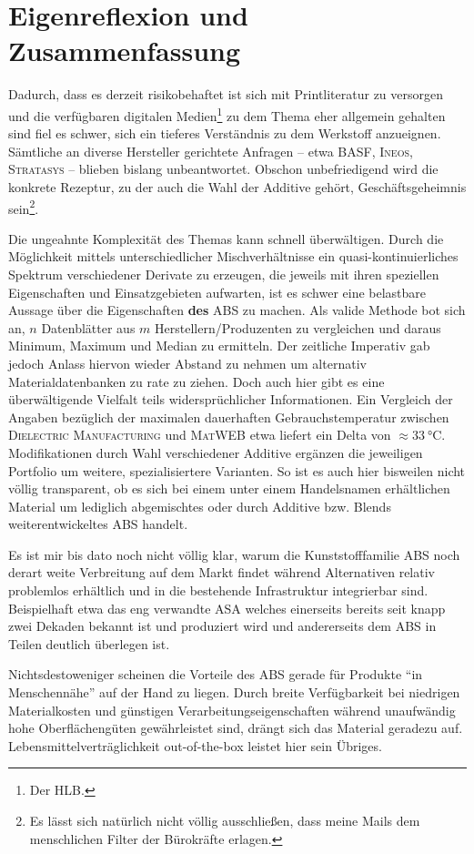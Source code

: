 \chapter{Eigenreflexion und Zusammenfassung}
    Dadurch, dass es derzeit risikobehaftet ist sich mit Printliteratur zu versorgen und die verfügbaren digitalen Medien\footnote{Der HLB.}
    zu dem Thema eher allgemein gehalten sind fiel es schwer, sich ein tieferes Verständnis zu dem Werkstoff anzueignen.
    Sämtliche an diverse Hersteller gerichtete Anfragen – etwa \textsc{BASF}, \textsc{Ineos}, \textsc{Stratasys} – blieben bislang unbeantwortet.
    Obschon unbefriedigend wird die konkrete Rezeptur, zu der auch die Wahl der Additive gehört, Geschäftsgeheimnis sein\footnote{Es lässt sich natürlich nicht völlig ausschließen, dass meine Mails dem menschlichen Filter der Bürokräfte erlagen.}.
    
    \medskip
    Die ungeahnte Komplexität des Themas kann schnell überwältigen. Durch die Möglichkeit mittels unterschiedlicher Mischverhältnisse
    ein quasi-kontinuierliches Spektrum verschiedener Derivate zu erzeugen, die jeweils mit ihren speziellen Eigenschaften
    und Einsatzgebieten aufwarten, ist es schwer eine belastbare Aussage über die Eigenschaften \textbf{des} ABS zu machen.
    Als valide Methode bot sich an, \(n\) Datenblätter aus \(m\) Herstellern/Produzenten zu vergleichen und daraus Minimum,
    Maximum und Median zu ermitteln. Der zeitliche Imperativ gab jedoch Anlass hiervon wieder Abstand zu nehmen um
    alternativ Materialdatenbanken zu rate zu ziehen. Doch auch hier gibt es eine überwältigende Vielfalt teils widersprüchlicher Informationen.
    Ein Vergleich der Angaben bezüglich der maximalen dauerhaften Gebrauchstemperatur zwischen \textsc{Dielectric Manufacturing} \cite{ABS.Datasheet.dielectricmfg.20190227}
    und \textsc{MatWEB} \cite{materialdatenbank.ABS.matweb.com.20210210} etwa liefert ein Delta von \(\approx \SI{33}{\celsius}\).
    Modifikationen durch Wahl verschiedener Additive ergänzen die jeweiligen Portfolio um weitere, spezialisiertere Varianten.
    So ist es auch hier bisweilen nicht völlig transparent, ob es sich bei einem unter einem Handelsnamen erhältlichen Material
    um lediglich abgemischtes oder durch Additive bzw. Blends weiterentwickeltes ABS handelt.
    
    \medskip
    Es ist mir bis dato noch nicht völlig klar, warum die Kunststofffamilie ABS noch derart weite Verbreitung auf dem Markt
    findet während Alternativen relativ problemlos erhältlich und in die bestehende Infrastruktur integrierbar sind.
    Beispielhaft etwa das eng verwandte ASA welches einerseits bereits seit knapp zwei Dekaden bekannt ist und produziert
    wird und andererseits dem ABS in Teilen deutlich überlegen ist.

    Nichtsdestoweniger scheinen die Vorteile des ABS gerade für Produkte \enquote{in Menschennähe} auf der Hand zu liegen.
    Durch breite Verfügbarkeit bei niedrigen Materialkosten und günstigen Verarbeitungseigenschaften während unaufwändig hohe
    Oberflächengüten gewährleistet sind, drängt sich das Material geradezu auf. Lebensmittelverträglichkeit out-of-the-box
    leistet hier sein Übriges.